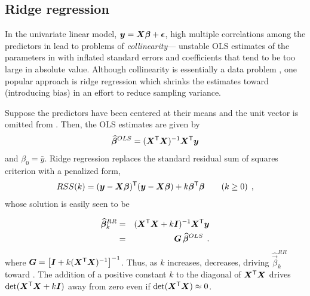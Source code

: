 \subsection{Ridge regression}
In the univariate linear model, $\bm{y} = \bm{X} \bm{\beta} + \bm{\epsilon}$,
high multiple correlations among the predictors in  lead to problems
of \emph{collinearity}--- unstable OLS
estimates of the parameters in \vec{\beta} with inflated standard errors
and coefficients that tend to be too large in absolute value.
Although collinearity is essentially a data problem 
\citep{Fox:2008},
one popular approach is ridge regression which shrinks the estimates toward
 (introducing bias) in an effort to reduce sampling variance.


Suppose the predictors have been centered at their means and the unit vector is
omitted from .
Then, the OLS estimates are given by
\begin{equation}
\widehat{\bm{\beta}}^{OLS} = (\bm{X}^\mathsf{T} \bm{X})^{-1} \bm{X}^\mathsf{T} \bm{y}
\end{equation}
and $\beta_0 = \bar{y}$.
Ridge regression replaces the standard residual sum of squares criterion with a penalized
form,
\begin{equation}
RSS(k) = (\bm{y}-\bm{X} \bm{\beta}) ^\mathsf{T}  (\bm{y}-\bm{X} \bm{\beta}) + k \bm{\beta}^\mathsf{T}\bm{\beta} \quad\quad (k \ge 0)
 \:\: , \label{eq:ridgeRSS}
\end{equation}
whose solution is easily seen to be

\begin{eqnarray}
\widehat{\bm{\beta}}^{RR}_k  & = &(\bm{X}^\mathsf{T} \bm{X} + k \bm{I})^{-1} \bm{X}^\mathsf{T} \bm{y}  \label{eq:ridge-beta} \\
                                    & = & \bm{G} \, \widehat{\bm{\beta}}^{OLS}  \nonumber \:\: .
\end{eqnarray}
where $\bm{G} = \left[\bm{I} + k (\bm{X}^\mathsf{T} \bm{X})^{-1} \right] ^{-1}$.
Thus, as $k$ increases,  decreases, driving $\widehat{\vec{\beta}}^{RR}_k$ toward 
\citep{HoerlKennard:1970a,HoerlKennard:1970b}.  The addition of a positive constant $k$ to the diagonal of $\bm{X}^\mathsf{T}\bm{X}$
drives $\mathrm{det} (\bm{X}^\mathsf{T}\bm{X}+ k \bm{I})$ away from zero even if $\mathrm{det} (\bm{X}^\mathsf{T}\bm{X})\approx 0$.

